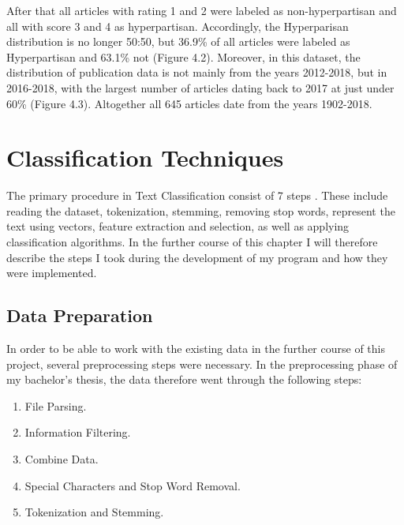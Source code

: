 \documentclass[a4paper, 11pt,titlepage,oneside,openany]{book}
\begin{document}
After that all articles with rating 1 and 2 were labeled as non-hyperpartisan and all with score 3 and 4 as hyperpartisan.
Accordingly, the Hyperparisan distribution is no longer 50:50, but 36.9\% of all articles were labeled as Hyperpartisan and 63.1\% not (Figure 4.2).
\noindent Moreover, in this dataset, the distribution of publication data is not mainly from the years 2012-2018, but in 2016-2018, with the largest number of articles dating back to 2017 at just under 60\% (Figure 4.3). Altogether all 645 articles date from the years 1902-2018.




\chapter{Classification Techniques}
The primary procedure in Text Classification consist of 7 steps \cite{textclassification}. These include  reading the dataset, tokenization, stemming, removing stop words, represent the text using vectors, feature extraction and selection, as well as applying classification algorithms. In the further course of this chapter I  will therefore describe the steps I took during the development of my program and how they were implemented.

\section{Data Preparation}
In order to be able to work with the existing data in the further course of this project, several preprocessing steps were necessary. In the preprocessing phase of my bachelor's thesis, the data therefore went through the following steps:
\begin{enumerate}
	\item File Parsing. 
	\item Information Filtering.
	\item Combine Data.
	\item Special Characters and Stop Word Removal.
	\item Tokenization and Stemming.
\end{enumerate}	
\end{document}
